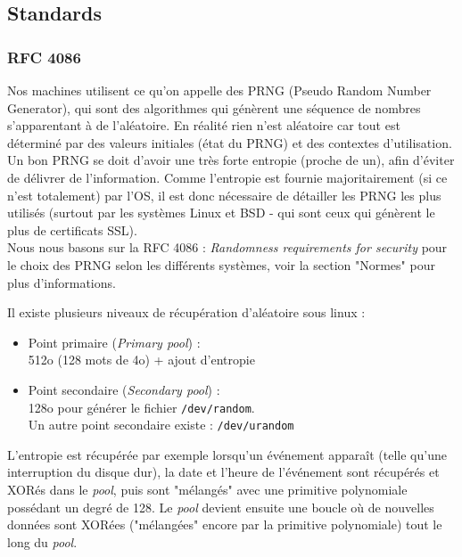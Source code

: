 \subsection{Standards}
	\subsubsection{RFC 4086}

			Nos machines utilisent ce qu'on appelle des PRNG (Pseudo Random Number Generator), qui sont des algorithmes qui génèrent une séquence de nombres s'apparentant à de l'aléatoire. En réalité rien n'est aléatoire car tout est déterminé par des valeurs initiales (état du PRNG) et des contextes d'utilisation.\\
			
			Un bon PRNG se doit d'avoir une très forte entropie (proche de un), afin d'éviter de délivrer de l'information.
		 Comme l'entropie est fournie majoritairement (si ce n'est totalement) par l'OS, il est donc nécessaire de détailler les PRNG les plus utilisés (surtout par les systèmes Linux et BSD - qui sont ceux qui génèrent le plus de certificats SSL).\\
		
			Nous nous basons sur la RFC 4086 \cite{rfc4086}: \textit{Randomness requirements for security} pour le choix des PRNG selon les différents	systèmes, voir la section "Normes" pour plus d'informations.	
	
		
			Il existe plusieurs niveaux de récupération d'aléatoire sous linux :\\
			\begin{itemize}
			\item Point primaire (\textit{Primary pool}) :\\
			512o (128 mots de 4o) + ajout d’entropie\\
			\item Point secondaire (\textit{Secondary pool}) :\\
			128o pour générer le fichier \texttt{/dev/random}. \\
			Un autre point secondaire existe : \texttt{/dev/urandom}\\
			\end{itemize}
			
			L'entropie est récupérée par exemple lorsqu'un événement apparaît (telle qu'une interruption du disque dur), la date et l'heure de l'événement sont récupérés et XORés dans le \textit{pool}, puis sont "mélangés" avec une primitive polynomiale possédant un degré de 128. Le \textit{pool} devient ensuite une boucle où de nouvelles données sont XORées ("mélangées" encore par la primitive polynomiale) tout le long du \textit{pool}.\\
			
